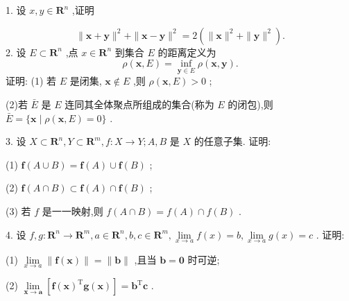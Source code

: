 1. 设 \(x,y \in  {\mathbf{R}}^{n}\) ,证明


\[
\parallel \mathbf{x} + \mathbf{y}{\parallel }^{2} + \parallel \mathbf{x} - \mathbf{y}{\parallel }^{2} = 2\left( {\parallel \mathbf{x}{\parallel }^{2} + \parallel \mathbf{y}{\parallel }^{2}}\right) .
\]
\hspace*{1em} 2. 设 \(E \subset  {\mathbf{R}}^{n}\) ,点 \(x \in  {\mathbf{R}}^{n}\) 到集合 \(E\) 的距离定义为
\[
\rho \left( {\mathbf{x},E}\right)  = \mathop{\inf }\limits_{{\mathbf{y} \in  E}}\rho \left( {\mathbf{x},\mathbf{y}}\right) .
\]
证明: (1) 若 \(E\) 是闭集, \(\mathbf{x} \notin  E\) ,则 \(\rho \left( {\mathbf{x},E}\right)  > 0\) ;

\hspace*{1em} (2)若 \(\bar{E}\) 是 \(E\) 连同其全体聚点所组成的集合(称为 \(E\) 的闭包),则 \(\bar{E} = \{ \mathbf{x} \mid  \rho \left( {\mathbf{x},E}\right)  = 0\}\) .

\hspace*{1em} 3. 设 \(X \subset  {\mathbf{R}}^{n},Y \subset  {\mathbf{R}}^{m},f : X \rightarrow  Y;A,B\) 是 \(X\) 的任意子集. 证明:

\hspace*{1em} (1) \(\mathbf{f}\left( {A \cup  B}\right)  = \mathbf{f}\left( A\right)  \cup  \mathbf{f}\left( B\right)\) ;

\hspace*{1em} (2) \(\mathbf{f}\left( {A \cap  B}\right)  \subset  \mathbf{f}\left( A\right)  \cap  \mathbf{f}\left( B\right)\) ;

\hspace*{1em} (3) 若 \(f\) 是一一映射,则 \(f\left( {A \cap  B}\right)  = f\left( A\right)  \cap  f\left( B\right)\) .

\hspace*{1em} 4. 设 \(f,g : {\mathbf{R}}^{n} \rightarrow  {\mathbf{R}}^{m},a \in  {\mathbf{R}}^{n},b,c \in  {\mathbf{R}}^{m},\mathop{\lim }\limits_{{x \rightarrow  a}}f\left( x\right)  = b,\mathop{\lim }\limits_{{x \rightarrow  a}}g\left( x\right)  = c\) . 证明:

\hspace*{1em} (1) \(\mathop{\lim }\limits_{{x \rightarrow  a}}\parallel \mathbf{f}\left( \mathbf{x}\right) \parallel  = \parallel \mathbf{b}\parallel\) ,且当 \(\mathbf{b} = \mathbf{0}\) 时可逆;

\hspace*{1em} (2) \(\mathop{\lim }\limits_{{\mathbf{x} \rightarrow  \mathbf{a}}}\left\lbrack  {\mathbf{f}{\left( \mathbf{x}\right) }^{\mathrm{T}}\mathbf{g}\left( \mathbf{x}\right) }\right\rbrack   = {\mathbf{b}}^{\mathrm{T}}\mathbf{c}\) .

